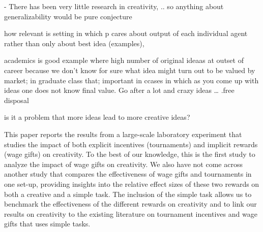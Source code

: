 -	There has been very little research in creativity, .. so anything about generalizability would be pure conjecture

how relevant is setting in which p cares about output of each individual agent rather than only about best idea (examples),

academics is good example where high number of original ideaas at outset of career because we don’t know for sure what idea might turn out to be valued by market; 
in graduate class that; important in ccases in which as you come up with ideas one does not know final value. 
Go after a lot and crazy ideas … .free disposal

 is it a problem that more ideas lead to more creative ideas?




This paper reports the results from a large-scale laboratory experiment that studies the impact of both explicit  incentives (tournaments) and implicit rewards (wage gifts)
on creativity. 
To the best of our knowledge, this is the first study to analyze the impact of wage gifts on creativity. We also have not come across another study that compares the effectiveness of wage gifts and tournaments in one set-up, providing insights into the relative effect sizes of these two rewards on both a creative and a simple task. The inclusion of the simple task allows us to benchmark the effectiveness of the different rewards on creativity and to link our results on creativity to the existing literature on tournament incentives and wage gifts that uses simple tasks. 


